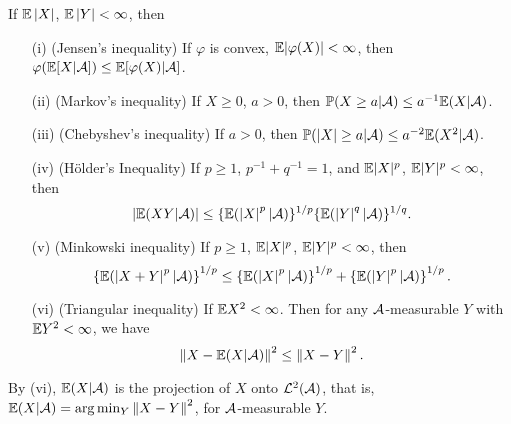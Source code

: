 \documentclass[10pt,a4paper]{article}
\begin{document}
\begin{thmbox}
	\begin{theorem}[Inequalities]\label{thm:cond_exp_ineq}\rm
		If $\mathbb E \left\lvert X\right\rvert$, $\mathbb E \left\lvert Y\right\rvert<\infty $, then 
		\begin{itemize}
			\item[(i)] (Jensen's inequality) If $\varphi$ is convex, $\mathbb E|\varphi(X)|<\infty $, then $\varphi(\mathbb E[X|{\cal A}])\leq \mathbb E[\varphi(X)|{\cal A}]$.  
			\item[(ii)] (Markov's inequality) If $X\geq 0$, $a>0$, then $\mathbb P(X\geq a|{\cal A})\leq a^{-1}\mathbb E(X|{\cal A})$.
			\item[(iii)] (Chebyshev's inequality) If $a>0$, then $\mathbb P(\left\lvert X\right\rvert\geq a|{\cal A})\leq a^{-2}\mathbb E(X^2|{\cal A})$.
			\item[(iv)] (Hölder's Inequality) If $p\geq 1$, $p^{-1}+q^{-1}=1$, and $\mathbb E|X|^p$, $\mathbb E|Y|^p<\infty $, then 
			{\setlength\abovedisplayskip{0.15cm}
			\setlength\belowdisplayskip{0.15cm}
			\begin{equation*}
				\left\lvert\mathbb E(XY|{\cal A})\right\rvert\leq \{\mathbb E(\left\lvert X\right\rvert^p|{\cal A})\}^{1/p} \{\mathbb E(\left\lvert Y\right\rvert^q|{\cal A})\}^{1/q}.
			\end{equation*}}
			\item[(v)] (Minkowski inequality) If $p\geq 1$, $\mathbb E|X|^p$, $\mathbb E|Y|^p<\infty $, then 
			{\setlength\abovedisplayskip{0.15cm}
			\setlength\belowdisplayskip{0.15cm}
			\begin{equation*}
				\left\{ {\mathbb E(\left\lvert X+Y\right\rvert^p|{\cal A})}\right\}^{1/p} \leq	\left\{ {\mathbb E(\left\lvert X\right\rvert^p|{\cal A})}\right\}^{1/p} + \left\{ {\mathbb E(\left\lvert Y\right\rvert^p|{\cal A})}\right\}^{1/p}.
			\end{equation*}}
			\item[(vi)] (Triangular inequality) If $\mathbb E X^2 <\infty $. Then for any ${\cal A}$-measurable $Y$ with $\mathbb E Y^2<\infty $, we have  
			{\setlength\abovedisplayskip{0.15cm}
			\setlength\belowdisplayskip{0.15cm}
			\begin{equation*}
				\left\lVert X-\mathbb E(X|{\cal A})\right\rVert^2 \leq \left\lVert X-Y\right\rVert^2.
			\end{equation*}}    
		\end{itemize}  
	\end{theorem}
\end{thmbox}
By (vi), $\mathbb E(X|{\cal A})$ is the projection of $X$ onto ${\cal L}^2({\cal A})$, that is, $\mathbb E(X|{\cal A})=\arg \min_Y \left\lVert X-Y\right\rVert^2$, for ${\cal A}$-measurable $Y$. 
\end{document}
